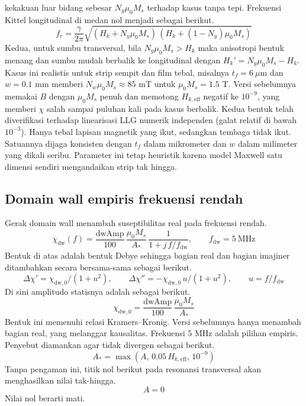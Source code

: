 \documentclass[a4paper,11pt]{article}
\begin{document}
kekakuan luar bidang sebesar $N_{y}\mu_{0}M_{s}$ terhadap kasus tanpa tepi.
Frekuensi Kittel longitudinal di medan nol menjadi sebagai berikut.
\begin{equation*}
f_{r} = \frac{\gamma}{2\pi}
\sqrt{(H_{k}+N_{y}\mu_{0}M_{s})\,(H_{k}+(1-N_{y})\mu_{0}M_{s})}
\end{equation*}
Kedua, untuk sumbu transversal, bila $N_{y}\mu_{0}M_{s}>H_{k}$ maka anisotropi
bentuk menang dan sumbu mudah berbalik ke longitudinal dengan
$H_{k}'=N_{y}\mu_{0}M_{s}-H_{k}$. Kasus ini realistis untuk strip sempit dan film
tebal, misalnya $t_{f}=6\ \mu$m dan $w=0.1$ mm memberi
$N_{w}\mu_{0}M_{s}\approx 85$ mT untuk $\mu_{0}M_{s}=1.5$ T.
Versi sebelumnya memakai $B$ dengan $\mu_{0}M_{s}$ penuh dan memotong
$H_{k,\mathrm{eff}}$ negatif ke $10^{-9}$, yang memberi $\chi$ salah sampai
puluhan kali pada kasus berbalik. Kedua bentuk telah diverifikasi terhadap
linearisasi LLG numerik independen (galat relatif di bawah $10^{-3}$).
Hanya tebal lapisan magnetik yang ikut, sedangkan tembaga tidak ikut.
Satuannya dijaga konsisten dengan $t_{f}$ dalam mikrometer dan $w$ dalam
milimeter yang dikali seribu. Parameter ini tetap heuristik karena model
Maxwell satu dimensi sendiri mengandaikan strip tak hingga.

\subsection{Domain wall empiris frekuensi rendah}
Gerak domain wall menambah suseptibilitas real pada frekuensi rendah.
\begin{equation*}
\chi_{\mathrm{dw}}(f) =
\frac{\mathrm{dwAmp}}{100}\,\frac{\mu_{0}M_{s}}{A_{\ast}}\,
\frac{1}{1+j\,f/f_{\mathrm{dw}}},\qquad f_{\mathrm{dw}}=5\ \mathrm{MHz}
\end{equation*}
Bentuk di atas adalah bentuk Debye sehingga bagian real dan bagian imajiner
ditambahkan secara bersama-sama sebagai berikut.
\begin{equation*}
\Delta\chi' = \chi_{\mathrm{dw},0}/(1+u^{2}),\qquad
\Delta\chi'' = -\chi_{\mathrm{dw},0}\,u/(1+u^{2}),\qquad u=f/f_{\mathrm{dw}}
\end{equation*}
Di sini amplitudo statisnya adalah sebagai berikut.
\begin{equation*}
\chi_{\mathrm{dw},0} = \frac{\mathrm{dwAmp}}{100}\,\frac{\mu_{0}M_{s}}{A_{\ast}}
\end{equation*}
Bentuk ini memenuhi relasi Kramers--Kronig. Versi sebelumnya hanya menambah
bagian real, yang melanggar kausalitas. Frekuensi $5$ MHz adalah pilihan empiris.
Penyebut diamankan agar tidak divergen sebagai berikut.
\begin{equation*}
A_{\ast} = \max(A,\,0.05\,H_{k,\mathrm{eff}},\,10^{-9})
\end{equation*}
Tanpa pengaman ini, titik nol berikut pada resonansi transversal
akan menghasilkan nilai tak-hingga.
\begin{equation*}
A = 0
\end{equation*}
Nilai nol berarti mati.
\end{document}
